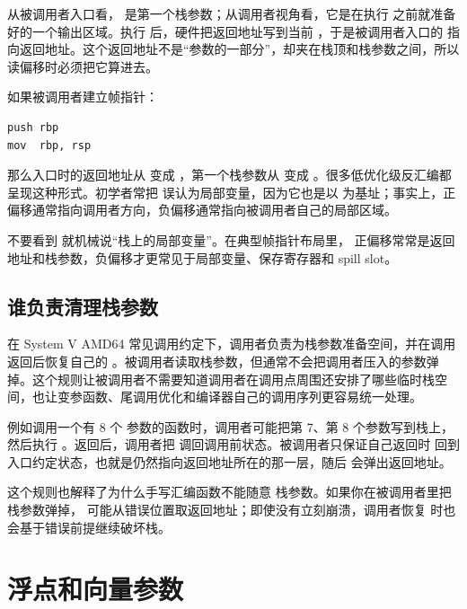 从被调用者入口看，\code{[rsp + 8]} 是第一个栈参数；从调用者视角看，它是在执行  之前就准备好的一个输出区域。执行  后，硬件把返回地址写到当前 ，于是被调用者入口的  指向返回地址。这个返回地址不是“参数的一部分”，却夹在栈顶和栈参数之间，所以读偏移时必须把它算进去。

如果被调用者建立帧指针：

\begin{lstlisting}
push rbp
mov  rbp, rsp
\end{lstlisting}

那么入口时的返回地址从 \code{[rsp]} 变成 \code{[rbp + 8]}，第一个栈参数从 \code{[rsp + 8]} 变成 \code{[rbp + 16]}。很多低优化级反汇编都呈现这种形式。初学者常把 \code{[rbp + 16]} 误认为局部变量，因为它也是以  为基址；事实上，正偏移通常指向调用者方向，负偏移通常指向被调用者自己的局部区域。

\begin{warningbox}
不要看到 \code{[rbp + 16]} 就机械说“栈上的局部变量”。在典型帧指针布局里， 正偏移常常是返回地址和栈参数，负偏移才更常见于局部变量、保存寄存器和 spill slot。
\end{warningbox}

\subsection{谁负责清理栈参数}

在 System V AMD64 常见调用约定下，调用者负责为栈参数准备空间，并在调用返回后恢复自己的 。被调用者读取栈参数，但通常不会把调用者压入的参数弹掉。这个规则让被调用者不需要知道调用者在调用点周围还安排了哪些临时栈空间，也让变参函数、尾调用优化和编译器自己的调用序列更容易统一处理。

例如调用一个有 8 个  参数的函数时，调用者可能把第 7、第 8 个参数写到栈上，然后执行 。返回后，调用者把  调回调用前状态。被调用者只保证自己返回时  回到入口约定状态，也就是仍然指向返回地址所在的那一层，随后  会弹出返回地址。

这个规则也解释了为什么手写汇编函数不能随意  栈参数。如果你在被调用者里把栈参数弹掉， 可能从错误位置取返回地址；即使没有立刻崩溃，调用者恢复  时也会基于错误前提继续破坏栈。

\section{浮点和向量参数}

